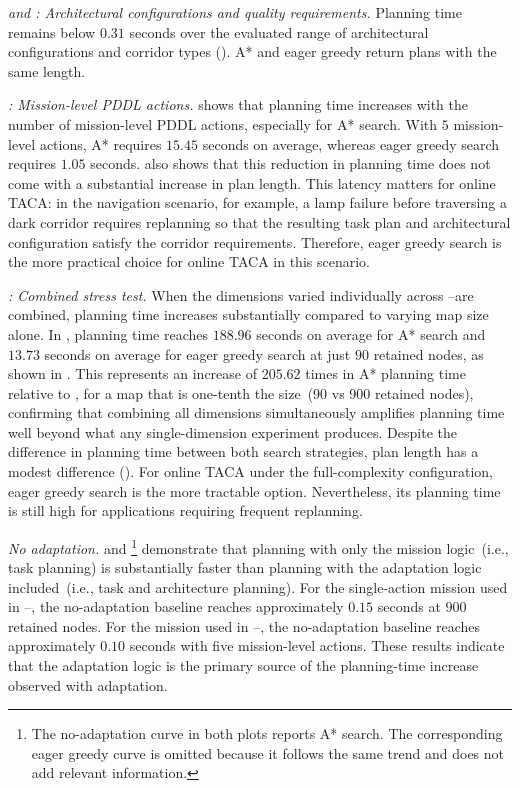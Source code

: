 \emph{\Stwo and \Sthree: Architectural configurations and quality requirements.}
Planning time remains below $0.31$ seconds over the evaluated range of architectural configurations and corridor types (). A* and eager greedy return plans with the same length.

\emph{\Sfour: Mission-level PDDL actions.}
 shows that planning time increases with the number of mission-level PDDL actions, especially for A* search. With $5$ mission-level actions, A* requires $15.45$ seconds on average, whereas eager greedy search requires $1.05$ seconds.  also shows that this reduction in planning time does not come with a substantial increase in plan length. This latency matters for online TACA\@: in the navigation scenario, for example, a lamp failure before traversing a dark corridor requires replanning so that the resulting task plan and architectural configuration satisfy the corridor requirements. Therefore, eager greedy search is the more practical choice for online TACA in this scenario.

\emph{\Sfive: Combined stress test.}
When the dimensions varied individually across \Sone--\Sfour are combined, planning time increases substantially compared to varying map size alone. In \Sfive, planning time reaches $188.96$ seconds on average for A* search and $13.73$ seconds on average for eager greedy search at just $90$ retained nodes, as shown in . This represents an increase of $205.62$ times in A* planning time relative to \Sone, for a map that is one-tenth the size~(90 vs 900 retained nodes), confirming that combining all dimensions simultaneously amplifies planning time well beyond what any single-dimension experiment produces. Despite the difference in planning time between both search strategies, plan length has a modest difference (). For online TACA under the full-complexity configuration, eager greedy search is the more tractable option. Nevertheless, its planning time is still high for applications requiring frequent replanning.

\emph{No adaptation.}
 and \footnote{The no-adaptation curve in both plots reports A* search. The corresponding eager greedy curve is omitted because it follows the same trend and does not add relevant information.} demonstrate that planning with only the mission logic~(i.e., task planning) is substantially faster than planning with the adaptation logic included~(i.e., task and architecture planning). For the single-action mission used in \Sone--\Sthree, the no-adaptation baseline reaches approximately $0.15$ seconds at $900$ retained nodes. For the mission used in \Sfour--\Sfive, the no-adaptation baseline reaches approximately $0.10$ seconds with five mission-level actions. These results indicate that the adaptation logic is the primary source of the planning-time increase observed with adaptation.

